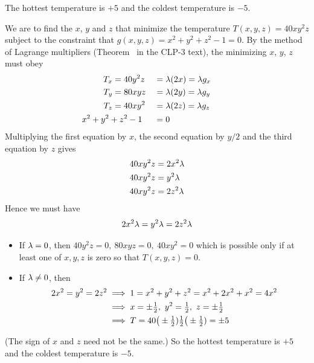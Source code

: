 \begin{answer}
The hottest temperature is $+5$ and the coldest temperature
is $-5$.
\end{answer}

\begin{solution}
We are to find the $x$, $y$ and $z$ that minimize the temperature 
$T(x,y,z)=40xy^2z$ subject to the constraint that 
$g(x,y,z)=x^2+y^2+z^2-1=0$. By the method of
Lagrange multipliers (Theorem~ in the CLP-3 text),
the minimizing $x$, $y$, $z$ must obey
\begin{alignat*}{3}
T_x&=40y^2z&&=\la(2x)=\la g_x \\
T_y&=80xyz&&=\la(2y)=\la g_y \\
T_z&=40xy^2&&=\la(2z)=\la g_z \\
&\hskip-0.5in x^2+y^2+z^2-1&&=0
\end{alignat*}
Multiplying the first equation by $x$, the second equation by $y/2$ 
and the third equation by $z$ gives
\begin{align*}
40xy^2z&=2x^2\lambda \\
40xy^2z&=y^2\lambda \\
40xy^2z&=2z^2\lambda
\end{align*}
Hence we must have
\begin{equation*}
2x^2\lambda=y^2\lambda=2z^2\lambda
\end{equation*}
\begin{itemize}
\item 
If $\lambda=0$, then $40y^2z=0,\ 80xyz=0,\ 40xy^2=0$ which is possible only
if at least one of $x,y,z$ is zero so that $T(x,y,z)=0$. 
\item 
If $\lambda\ne 0$, then 
\begin{align*}
2x^2=y^2=2z^2
&\implies 1=x^2+y^2+z^2=x^2+2x^2+x^2=4x^2 \\
&\implies x=\pm\tfrac{1}{2},\ y^2=\tfrac{1}{2},\ z=\pm \tfrac{1}{2} \\
&\implies T=40\big(\pm\tfrac{1}{2})\tfrac{1}{2}\big(\pm\tfrac{1}{2})=\pm 5
\end{align*}
\end{itemize}
(The sign of $x$ and $z$ need not be the same.)
So the hottest temperature is $+5$ and the coldest temperature
is $-5$.
\end{solution}

